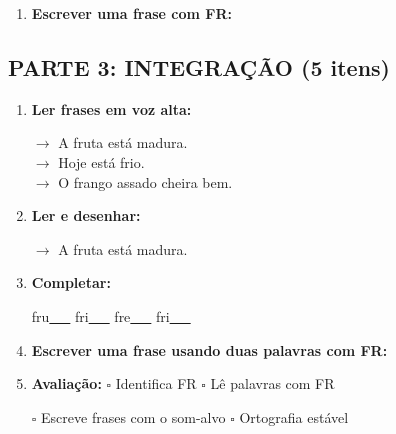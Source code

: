 \begin{exercicio}
\begin{enumerate}[resume]
  \item \textbf{Escrever uma frase com FR:}
  \begin{center}
  \underline{\hspace{12cm}}
  \end{center}

\end{enumerate}

\subsection*{PARTE 3: INTEGRAÇÃO (5 itens)}

\begin{enumerate}[resume]

  \item \textbf{Ler frases em voz alta:}
  \begin{center}
  $\rightarrow$ A fruta está madura.\\
  $\rightarrow$ Hoje está frio.\\
  $\rightarrow$ O frango assado cheira bem.\\
  \end{center}

  \item \textbf{Ler e desenhar:}
  \begin{center}
  $\rightarrow$ A fruta está madura.
  \end{center}
  \begin{center}
  \end{center}

  \item \textbf{Completar:}
  \begin{center}
  fru\underline{~~~} \quad fri\underline{~~~} \quad fre\underline{~~~} \quad fri\underline{~~~}
  \end{center}

  \item \textbf{Escrever uma frase usando duas palavras com FR:}
  \begin{center}
  \underline{\hspace{12cm}}
  \end{center}

  \item \textbf{Avaliação:} $\square$ Identifica FR \quad $\square$ Lê palavras com FR
  \begin{center}
  $\square$ Escreve frases com o som-alvo \quad $\square$ Ortografia estável
  \end{center}


\end{enumerate}
\end{exercicio}
